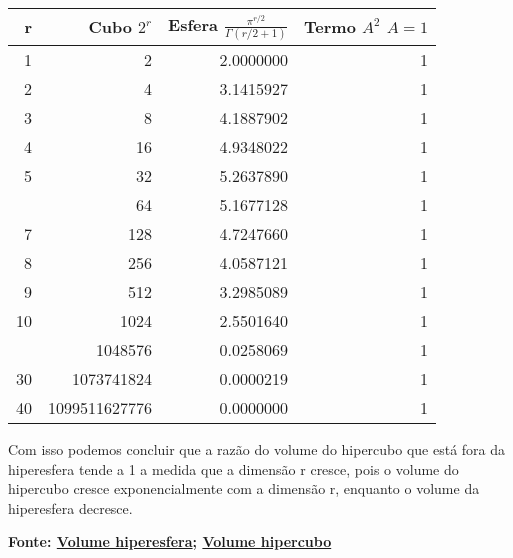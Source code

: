 \documentclass[
]{article}
\begin{document}
\begin{table}[!h]
\centering
\begin{tabular}{rrrr}
\toprule
r & \makecell[c]{Cubo \\ $2^r$} & \makecell[c]{Esfera \\ $\frac{\pi^{r/2}}{\Gamma(r/2 + 1)}$} & \makecell[c]{Termo \\ $A^2$ \\ $A=1$}\\
\midrule
1 & 2 & 2.0000000 & 1\\
2 & 4 & 3.1415927 & 1\\
3 & 8 & 4.1887902 & 1\\
4 & 16 & 4.9348022 & 1\\
5 & 32 & 5.2637890 & 1\\
\addlinespace
6 & 64 & 5.1677128 & 1\\
7 & 128 & 4.7247660 & 1\\
8 & 256 & 4.0587121 & 1\\
9 & 512 & 3.2985089 & 1\\
10 & 1024 & 2.5501640 & 1\\
\addlinespace
20 & 1048576 & 0.0258069 & 1\\
30 & 1073741824 & 0.0000219 & 1\\
40 & 1099511627776 & 0.0000000 & 1\\
\bottomrule
\end{tabular}
\end{table}

Com isso podemos concluir que a razão do volume do hipercubo que está
fora da hiperesfera tende a 1 a medida que a dimensão r cresce, pois o
volume do hipercubo cresce exponencialmente com a dimensão r, enquanto o
volume da hiperesfera decresce.

\textbf{Fonte:
\href{https://en.wikipedia.org/wiki/Volume_of_an_n-ball}{Volume
hiperesfera};
\href{https://www.quora.com/What-is-the-volume-of-a-four-dimensional-hypercube\#:~:text=For\%20a\%20hypercube\%20in\%20n,twice\%20the\%20number\%20of\%20dimensions.}{Volume
hipercubo}}
\end{document}

